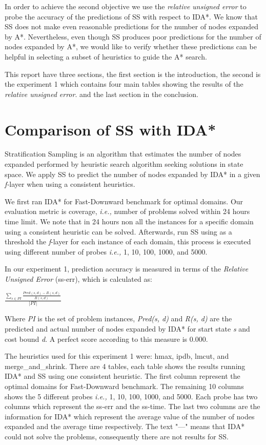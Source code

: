 \documentclass[a4paper,12pt]{article}
\begin{document}
In order to achieve the second objective we use the \textit{relative unsigned error} to probe the accuracy of the predictions of SS with respect to IDA*. We know that SS does not make even reasonable predictions for the number of nodes expanded by A*. Nevertheless, even though SS produces poor predictions for the number of nodes expanded by A*, we would like to verify whether these predictions can be helpful in selecting a subset of heuristics to guide the A* search.

This report have three sections, the first section is the introduction, the second is the experiment 1 which contains four main tables showing the results of the \textit{relative unsigned error}. and the last section in the conclusion.

\section{Comparison of SS with IDA*}
Stratification Sampling is an algorithm that estimates the number of nodes expanded performed by heuristic search algorithm seeking solutions in state space. We apply SS to predict the number of nodes expanded by IDA* in a given \textit{f-}layer when using a consistent heuristics.

We first ran IDA* for Fast-Downward benchmark for optimal domains. Our evaluation metric is coverage, \textit{i.e.,} number of problems solved within 24 hours time limit. We note that in 24 hours non all the instances for a specific domain using a consistent heuristic can be solved. Afterwards, run SS using as a threshold the \textit{f}-layer for each instance of each domain, this process is executed using different number of probes \textit{i.e.,} 1, 10, 100, 1000, and 5000. 

In our experiment 1, prediction accuracy is measured in terms of the \textit{Relative Unsigned Error} (ss-err), which is calculated as:


\begin{center}
$
\frac{\sum_{s\in PI} \frac{Pred(s, d) - R(s, d)}{R(s, d)}}{|PI|}
$
\end{center}

Where \textit{PI} is the set of problem instances, \textit{Pred(s, d)} and \textit{R(s, d)} are the predicted and actual number of nodes expanded by IDA* for start state \textit{s} and cost bound \textit{d}. A perfect score according to this measure is 0.000.


The heuristics used for this experiment 1 were: hmax, ipdb, lmcut, and {merge\_and\_shrink}. There are 4 tables, each table shows the results running IDA* and SS using one consistent heuristic. The first column represent the optimal domains for Fast-Downward benchmark. The remaining 10 columns shows the 5 different probes \textit{i.e.,} 1, 10, 100, 1000, and 5000. Each probe has two columns which represent the ss-err and the ss-time. The last two columns are the information for IDA* which represent the average value of the number of nodes expanded and the average time respectively. The text "---" means that IDA* could not solve the problems, consequently there are not results for SS.
\end{document}
